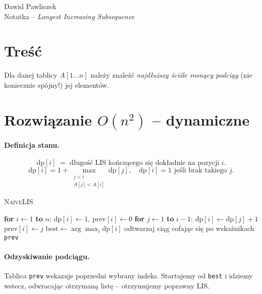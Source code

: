 \documentclass[11pt,a4paper]{article}
\begin{document}
\begin{center}
\Large Dawid Pawliczek\\
Notatka -- \textit{Longest Increasing Subsequence}
\end{center}

\bigskip
\section*{Treść}

Dla danej tablicy $A[1\dots n]$ należy znaleźć
\emph{najdłuższy ściśle rosnący podciąg}
(nie koniecznie spójny!) jej elementów.

\section*{Rozwiązanie $O(n^2)$ – dynamiczne}

\paragraph{Definicja stanu.}
\[
  \text{dp}[i] \;=\;
  \text{długość LIS kończącego się dokładnie na pozycji } i.
\]
\[
  \text{dp}[i]=
    1 + \max_{\substack{j<i\\A[j]<A[i]}}\text{dp}[j],
  \quad
  \text{dp}[i]=1 \text{ jeśli brak takiego } j.
\]

\begin{algorithm}[H]
\caption{\textsc{NaiveLIS}}
\begin{algorithmic}[1]
\State \textbf{for} $i\gets1$ \textbf{to} $n$:
   \State\hspace{1em}$\text{dp}[i]\gets1$, $\text{prev}[i]\gets0$
   \State\hspace{1em}\textbf{for} $j\gets1$ \textbf{to} $i-1$:
         \State\hspace{2em}$\text{dp}[i]\gets\text{dp}[j]+1$
         \State\hspace{2em}$\text{prev}[i]\gets j$
      \EndIf
\State $\text{best}\gets\arg\max_i\text{dp}[i]$
\State odtwarzaj ciąg cofając się po wskaźnikach \texttt{prev}
\State {}
\end{algorithmic}
\end{algorithm}

\paragraph{Odzyskiwanie podciągu.}
Tablica \texttt{prev} wskazuje poprzedni wybrany indeks.
Startujemy od \texttt{best} i idziemy wstecz,
odwracając otrzymaną listę – otrzymujemy poprawny LIS.
\end{document}
